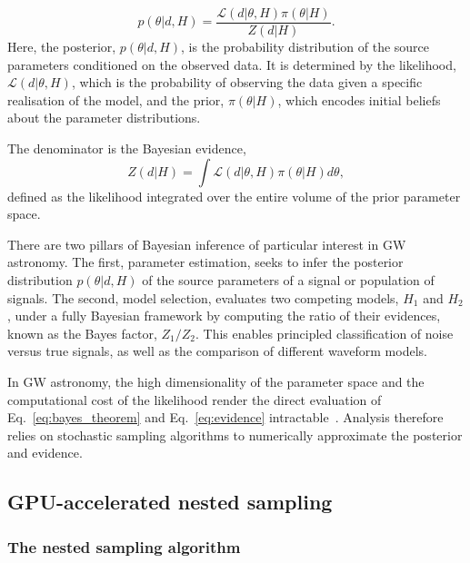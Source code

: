 \documentclass[fleqn,usenatbib]{mnras}
\begin{document}
\begin{equation}
    p(\theta|d, H) = \frac{\mathcal{L}(d|\theta, H) \pi(\theta|H)}{Z(d|H)}.
    \label{eq:bayes_theorem}
\end{equation}%
Here, the posterior, $p(\theta|d, H)$, is the probability distribution
of the source parameters conditioned on the observed data. It is
determined by the likelihood, $\mathcal{L}(d|\theta, H)$, which is the
probability of observing the data given a specific realisation of the
model, and the prior, $\pi(\theta|H)$, which encodes initial beliefs
about the parameter distributions.

The denominator is the Bayesian evidence,
\begin{equation}
    Z(d|H) = \int \mathcal{L}(d|\theta, H) \pi(\theta|H) d\theta,
    \label{eq:evidence}
\end{equation}
defined as the likelihood integrated over the entire volume of the
prior parameter space.

There are two pillars of Bayesian inference of particular interest
in GW astronomy. The first, parameter estimation, seeks to infer 
the posterior distribution $p(\theta|d, H)$ of the source parameters of a signal or population of signals.
The second, model selection, evaluates two competing
models, $H_1$ and $H_2$, under a fully Bayesian framework by computing the ratio of
their evidences, known as the Bayes factor, $Z_1 / Z_2$. This enables
principled classification of noise versus true signals, as well as the 
comparison of different waveform models.

In GW astronomy, the high dimensionality of the parameter space and
the computational cost of the likelihood render the direct evaluation
of Eq.~\ref{eq:bayes_theorem} and Eq.~\ref{eq:evidence} intractable~\citep{LIGO_guide_signalextraction}.
Analysis therefore relies on stochastic sampling algorithms to
numerically approximate the posterior and evidence.

\subsection{GPU-accelerated nested sampling}

\label{sec:background_ns_and_gpus}

\subsubsection{The nested sampling algorithm}
\label{sec:background_ns}
\end{document}
